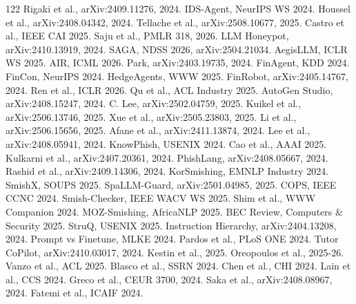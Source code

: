 \documentclass[11pt,a4paper]{article}
\begin{document}
\begin{thebibliography}{122}
 Rigaki et al., arXiv:2409.11276, 2024.
 IDS-Agent, NeurIPS WS 2024.
 Houssel et al., arXiv:2408.04342, 2024.
 Tellache et al., arXiv:2508.10677, 2025.
 Castro et al., IEEE CAI 2025.
 Saju et al., PMLR 318, 2026.
 LLM Honeypot, arXiv:2410.13919, 2024.
 SAGA, NDSS 2026, arXiv:2504.21034.
 AegisLLM, ICLR WS 2025.
 AIR, ICML 2026.
 Park, arXiv:2403.19735, 2024.
 FinAgent, KDD 2024.
 FinCon, NeurIPS 2024.
 HedgeAgents, WWW 2025.
 FinRobot, arXiv:2405.14767, 2024.
 Ren et al., ICLR 2026.
 Qu et al., ACL Industry 2025.
 AutoGen Studio, arXiv:2408.15247, 2024.
 C. Lee, arXiv:2502.04759, 2025.
 Kuikel et al., arXiv:2506.13746, 2025.
 Xue et al., arXiv:2505.23803, 2025.
 Li et al., arXiv:2506.15656, 2025.
 Afane et al., arXiv:2411.13874, 2024.
 Lee et al., arXiv:2408.05941, 2024.
 KnowPhish, USENIX 2024.
 Cao et al., AAAI 2025.
 Kulkarni et al., arXiv:2407.20361, 2024.
 PhishLang, arXiv:2408.05667, 2024.
 Rashid et al., arXiv:2409.14306, 2024.
 KorSmishing, EMNLP Industry 2024.
 SmishX, SOUPS 2025.
 SpaLLM-Guard, arXiv:2501.04985, 2025.
 COPS, IEEE CCNC 2024.
 Smish-Checker, IEEE WACV WS 2025.
 Shim et al., WWW Companion 2024.
 MOZ-Smishing, AfricaNLP 2025.
 BEC Review, Computers \& Security 2025.
 StruQ, USENIX 2025.
 Instruction Hierarchy, arXiv:2404.13208, 2024.
 Prompt vs Finetune, MLKE 2024.
 Pardos et al., PLoS ONE 2024.
 Tutor CoPilot, arXiv:2410.03017, 2024.
 Kestin et al., 2025.
 Oreopoulos et al., 2025-26.
 Vanzo et al., ACL 2025.
 Blasco et al., SSRN 2024.
 Chen et al., CHI 2024.
 Lain et al., CCS 2024.
 Greco et al., CEUR 3700, 2024.
 Saka et al., arXiv:2408.08967, 2024.
 Fatemi et al., ICAIF 2024.

\end{thebibliography}
\end{document}
